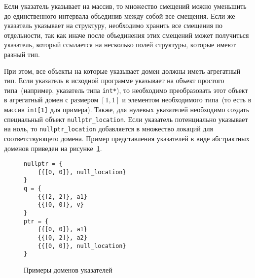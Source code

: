 Если указатель указывает на массив, то множество смещений можно уменьшить до 
единственного интервала объединив между собой все смещения. Если же указатель
указывает на структуру, необходимо хранить все смещения по отдельности, так
как иначе после объединения этих смещений может получиться указатель, который
ссылается на несколько полей структуры, которые имеют разный тип.

При этом, все объекты на которые указывает домен должны иметь агрегатный тип.
Если указатель в исходной программе указывает на объект простого 
типа~(например, указатель типа \texttt{int*}), то необходимо преобразовать 
этот объект в агрегатный домен с размером $[1, 1]$ и элементом необходимого 
типа~(то есть в массив \texttt{int[1]} для примера). Также, для нулевых 
указателей необходимо создать специальный объект \texttt{nullptr\_location}. 
Если указатель потенциально указывает на ноль, то \texttt{nullptr\_location} 
добавляется в множество локаций для соответствующего домена. Пример 
представления указателей в виде абстрактных доменов приведен на
рисунке~\ref{image:memory}.
\begin{figure}[h!]
\begin{lstlisting}[style=nostyle]
nullptr = {
    {{[0, 0]}, null_location}
}
q = {
    {{[2, 2]}, a1}
    {{[0, 0]}, v}
}
ptr = {
    {{[0, 0]}, a1}
    {{[0, 2]}, a2}
    {{[0, 0]}, null_location}
}
\end{lstlisting}
\caption{Примеры доменов указателей}
\label{image:memory}
\end{figure}

